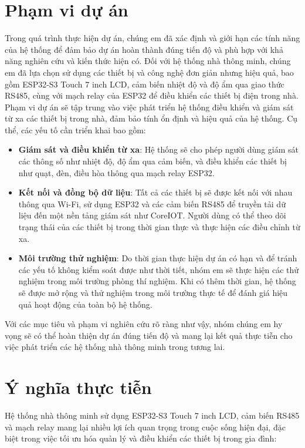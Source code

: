 \section{Phạm vi dự án}
\tab Trong quá trình thực hiện dự án, chúng em đã xác định và giới hạn các tính năng của hệ thống để đảm bảo dự án hoàn thành đúng tiến độ và phù hợp với khả năng nghiên cứu và kiến thức hiện có. Đối với hệ thống nhà thông minh, chúng em đã lựa chọn sử dụng các thiết bị và công nghệ đơn giản nhưng hiệu quả, bao gồm ESP32-S3 Touch 7 inch LCD, cảm biến nhiệt độ và độ ẩm qua giao thức RS485, cùng với mạch relay của ESP32 để điều khiển các thiết bị điện trong nhà.\\
\tab Phạm vi dự án sẽ tập trung vào việc phát triển hệ thống điều khiển và giám sát từ xa các thiết bị trong nhà, đảm bảo tính ổn định và hiệu quả của hệ thống. Cụ thể, các yếu tố cần triển khai bao gồm:

\begin{itemize} \item \textbf{Giám sát và điều khiển từ xa}: Hệ thống sẽ cho phép người dùng giám sát các thông số như nhiệt độ, độ ẩm qua cảm biến, và điều khiển các thiết bị như quạt, đèn, điều hòa thông qua mạch relay ESP32. \item \textbf{Kết nối và đồng bộ dữ liệu}: Tất cả các thiết bị sẽ được kết nối với nhau thông qua Wi-Fi, sử dụng ESP32 và các cảm biến RS485 để truyền tải dữ liệu đến một nền tảng giám sát như CoreIOT. Người dùng có thể theo dõi trạng thái của các thiết bị trong thời gian thực và thực hiện các điều chỉnh từ xa. \item \textbf{Môi trường thử nghiệm}: Do thời gian thực hiện dự án có hạn và để tránh các yếu tố không kiểm soát được như thời tiết, nhóm em sẽ thực hiện các thử nghiệm trong môi trường phòng thí nghiệm. Khi có thêm thời gian, hệ thống sẽ được mở rộng và thử nghiệm trong môi trường thực tế để đánh giá hiệu quả hoạt động của toàn bộ hệ thống. \end{itemize}

\tab Với các mục tiêu và phạm vi nghiên cứu rõ ràng như vậy, nhóm chúng em hy vọng sẽ có thể hoàn thiện dự án đúng tiến độ và mang lại kết quả thực tiễn cho việc phát triển các hệ thống nhà thông minh trong tương lai.

\section{Ý nghĩa thực tiễn}  
\tab Hệ thống nhà thông minh sử dụng ESP32-S3 Touch 7 inch LCD, cảm biến RS485 và mạch relay mang lại nhiều lợi ích quan trọng trong cuộc sống hiện đại, đặc biệt trong việc tối ưu hóa quản lý và điều khiển các thiết bị trong gia đình:

